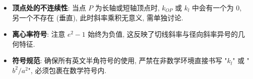 \begin{trapbox}
\begin{itemize}
    \item \textbf{顶点处的不连续性}: 当点 $P$ 为长轴或短轴顶点时, $k_{OP}$ 或 $k_l$ 中会有一个为 $0$, 另一个不存在 (垂直), 此时斜率乘积无意义, 需单独讨论.
    \item \textbf{离心率符号}: 注意 $e^2 - 1$ 始终为负值, 这反映了切线斜率与径向斜率异号的几何特征.
    \item \textbf{符号规范}: 确保所有英文半角符号的使用, 严禁在非数学环境直接书写 "$k_l$" 或 "$b^2/a^2$", 必须包裹在数学符号内.
\end{itemize}
\end{trapbox}
